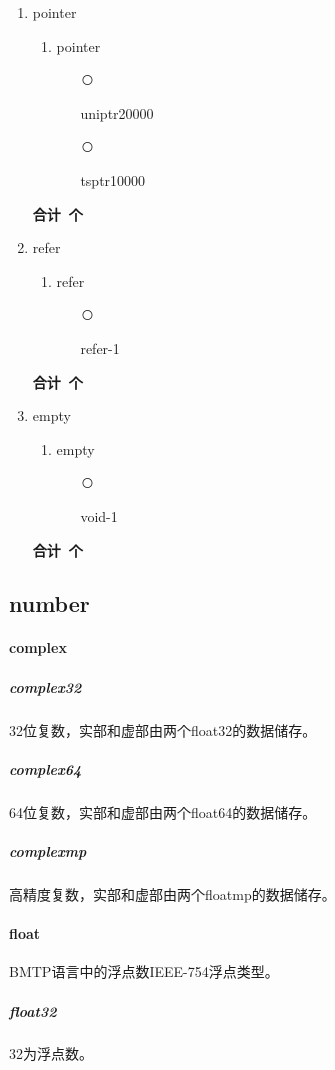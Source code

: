 \documentclass[11pt]{ctexrep}
\newcounter{typelist}
\newcommand{\circnum}{\addtocounter{typelist}{1}\textcircled{\tiny\thetypelist}}
\begin{document}
\begin{enumerate}
	\begin{enumerate}
	\item function
		\begin{enumerate}
		\item[\circnum] mathfun\hfill 10000
		\item[\circnum] function\hfill 20000
		\end{enumerate}
	\end{enumerate}
	\textbf{合计\thetypelist\ 个}
\item pointer
\setcounter{typelist}{0}
	\begin{enumerate}
	\item pointer
		\begin{enumerate}
		\item[\circnum] uniptr\hfill 20000
		\item[\circnum] tsptr\hfill 10000 
		\end{enumerate}
	\end{enumerate}
	\textbf{合计\thetypelist\ 个}
\item refer
\setcounter{typelist}{0}
	\begin{enumerate}
	\item refer
		\begin{enumerate}
		\item[\circnum] refer\hfill -1 
		\end{enumerate}
	\end{enumerate}
	\textbf{合计\thetypelist\ 个}
\item empty
\setcounter{typelist}{0}
\begin{enumerate}
	\item empty
		\begin{enumerate}
		\item[\circnum] void\hfill -1 
		\end{enumerate}
	\end{enumerate}
	\textbf{合计\thetypelist\ 个}
\end{enumerate}
\subsection{number}
\paragraph{complex}
\subparagraph{complex32}
32位复数，实部和虚部由两个float32的数据储存。
\subparagraph{complex64}
64位复数，实部和虚部由两个float64的数据储存。
\subparagraph{complexmp}
高精度复数，实部和虚部由两个floatmp的数据储存。
\paragraph{float}
\indent BMTP语言中的浮点数IEEE-754浮点类型。
\subparagraph{float32}
32为浮点数。
\end{document}
